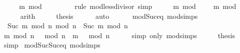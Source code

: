 \begin{isabellebody}
%
\isadelimproof
%
\endisadelimproof
%
\isatagproof
{}\isamarkupfalse%
\ {\isacharminus}{\kern0pt}\isanewline
\ \ \isamarkupfalse%
\ {\isachardoublequoteopen}m\ mod\ {}\ {\isacharless}{\kern0pt}\ {}{\isachardoublequoteclose}\isanewline
\ \ \ \ \isamarkupfalse%
\ {\isacharparenleft}{\kern0pt}rule\ mod{\isacharunderscore}{\kern0pt}less{\isacharunderscore}{\kern0pt}divisor{\isacharparenright}{\kern0pt}\ simp\isanewline
\ \ \isamarkupfalse%
\ \isamarkupfalse%
\ {\isachardoublequoteopen}m\ mod\ {}\ {\isacharequal}{\kern0pt}\ {}\ {\isasymor}\ m\ mod\ {}\ {\isacharequal}{\kern0pt}\ {}{\isachardoublequoteclose}\isanewline
\ \ \ \ \isamarkupfalse%
\ arith\isanewline
\ \ \isamarkupfalse%
\ \isamarkupfalse%
\ {\isacharquery}{\kern0pt}thesis\isanewline
\ \ \ \ \isamarkupfalse%
\ auto\ \ \ \ \ \isanewline
{}\isamarkupfalse%
%
\endisatagproof
{\isafoldproof}%
%
\isadelimproof
\isanewline
%
\endisadelimproof
\isanewline
{}\isamarkupfalse%
\ mod{\isacharunderscore}{\kern0pt}Suc{\isacharunderscore}{\kern0pt}eq\ {\isacharbrackleft}{\kern0pt}mod{\isacharunderscore}{\kern0pt}simps{\isacharbrackright}{\kern0pt}{\isacharcolon}{\kern0pt}\isanewline
\ \ {\isachardoublequoteopen}Suc\ {\isacharparenleft}{\kern0pt}m\ mod\ n{\isacharparenright}{\kern0pt}\ mod\ n\ {\isacharequal}{\kern0pt}\ Suc\ m\ mod\ n{\isachardoublequoteclose}\isanewline
%
\isadelimproof
%
\endisadelimproof
%
\isatagproof
{}\isamarkupfalse%
\ {\isacharminus}{\kern0pt}\isanewline
\ \ \isamarkupfalse%
\ {\isachardoublequoteopen}{\isacharparenleft}{\kern0pt}m\ mod\ n\ {\isacharplus}{\kern0pt}\ {}{\isacharparenright}{\kern0pt}\ mod\ n\ {\isacharequal}{\kern0pt}\ {\isacharparenleft}{\kern0pt}m\ {\isacharplus}{\kern0pt}\ {}{\isacharparenright}{\kern0pt}\ mod\ n{\isachardoublequoteclose}\isanewline
\ \ \ \ \isamarkupfalse%
\ {\isacharparenleft}{\kern0pt}simp\ only{\isacharcolon}{\kern0pt}\ mod{\isacharunderscore}{\kern0pt}simps{\isacharparenright}{\kern0pt}\isanewline
\ \ \isamarkupfalse%
\ \isamarkupfalse%
\ {\isacharquery}{\kern0pt}thesis\isanewline
\ \ \ \ \isamarkupfalse%
\ simp\isanewline
{}\isamarkupfalse%
%
\endisatagproof
{\isafoldproof}%
%
\isadelimproof
\isanewline
%
\endisadelimproof
\isanewline
{}\isamarkupfalse%
\ mod{\isacharunderscore}{\kern0pt}Suc{\isacharunderscore}{\kern0pt}Suc{\isacharunderscore}{\kern0pt}eq\ {\isacharbrackleft}{\kern0pt}mod{\isacharunderscore}{\kern0pt}simps{\isacharbrackright}{\kern0pt}{\isacharcolon}{\kern0pt}\isanewline

\end{isabellebody}
